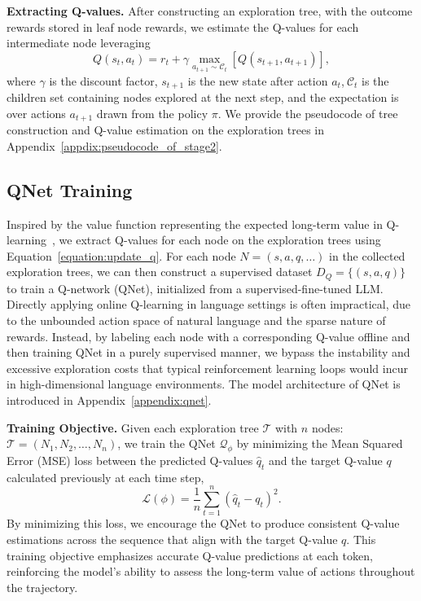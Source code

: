 \textbf{Extracting Q-values.} After constructing an exploration tree, with the outcome rewards stored in leaf node rewards, we estimate the Q-values for each intermediate node leveraging
\begin{equation}
\label{equation:update_q}
    Q(s_t, a_t) = r_t + \gamma \max_{a_{t+1} \sim \mathcal{C}_t} [ Q(s_{t+1}, a_{t+1}) ],
\end{equation}
where $\gamma$ is the discount factor, $s_{t+1}$ is the new state after action $a_t$,$\ \mathcal{C}_t$ is the children set containing nodes explored at the next step, and the expectation is over actions $a_{t+1}$ drawn from the policy $\pi$.
We provide the pseudocode of tree construction and Q-value estimation on the exploration trees in Appendix~\ref{appdix:pseudocode_of_stage2}.
    
\subsection{QNet Training}

Inspired by the value function representing the expected long-term value in Q-learning~\citep{qlearning}, we extract Q-values for each node on the exploration trees using Equation~\ref{equation:update_q}. For each node \(N=(s,a,q,\dots)\) in the collected exploration trees, we can then construct a supervised dataset \(D_Q=\{(s,a,q)\}\) to train a Q-network (QNet), initialized from a supervised-fine-tuned LLM. Directly applying online Q-learning in language settings is often impractical, due to the unbounded action space of natural language and the sparse nature of rewards. Instead, by labeling each node with a corresponding Q-value offline and then training QNet in a purely supervised manner, we bypass the instability and excessive exploration costs that typical reinforcement learning loops would incur in high-dimensional language environments. The model architecture of QNet is introduced in Appendix~\ref{appendix:qnet}.


\textbf{Training Objective.} Given each exploration tree $\mathcal{T}$ with $n$ nodes: $\mathcal{T} = (N_1, N_2, \dots, N_n)$, we train the QNet $ \mathcal{Q}_\phi$ by minimizing the Mean Squared Error (MSE) loss between the predicted Q-values $\hat{q}_t$ and the target Q-value $q$ calculated previously at each time step,
\begin{equation}
\mathcal{L}(\phi) = \frac{1}{n} \sum_{t=1}^{n} \left( \hat{q}_t - q_t \right)^2.
\end{equation}
By minimizing this loss, we encourage the QNet to produce consistent Q-value estimations across the sequence that align with the target Q-value $q$. This training objective emphasizes accurate Q-value predictions at each token, reinforcing the model's ability to assess the long-term value of actions throughout the trajectory.

